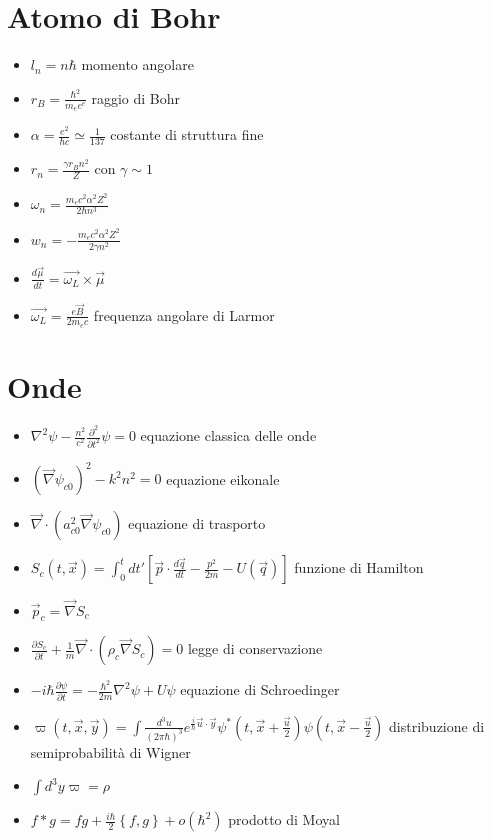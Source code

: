 \documentclass[a4paper]{article}
\begin{document}
    \section{Atomo di Bohr}
        \begin{itemize}
            \item $l_n=n\hbar$ momento angolare
            \item $r_B=\frac{\hbar^2}{m_ee^e}$ raggio di Bohr
            \item $\alpha=\frac{e^2}{\hbar c}\simeq\frac{1}{137}$ costante di struttura fine
            \item $r_n=\frac{\gamma r_Bn^2}{Z}$ con $\gamma\sim 1$
            \item $\omega_n=\frac{m_ec^2\alpha^2Z^2}{2\hbar n^3}$
            \item $w_n=-\frac{m_ec^2\alpha^2Z^2}{2\gamma n^2}$
            \item $\frac{d\vec{\mu}}{dt}=\vec{\omega_L}\times\vec{\mu}$
            \item $\vec{\omega_L}=\frac{e\vec{B}}{2m_ec}$ frequenza angolare di Larmor
        \end{itemize}
    
    \section{Onde}
        \begin{itemize}
            \item $\nabla^2\psi-\frac{n^2}{c^2}\frac{\partial^2}{\partial t^2}\psi=0$ equazione classica delle onde
            \item $(\vec{\nabla}\psi_{c0})^2-k^2n^2=0$ equazione eikonale
            \item $\vec{\nabla}\cdot(a_{c0}^2\vec{\nabla}\psi_{c0})$ equazione di trasporto
            \item $S_c(t,\vec{x})=\int_0^t dt'\left[\vec{p}\cdot\frac{d\vec{q}}{dt}-\frac{p^2}{2m}-U(\vec{q})\right]$ funzione di Hamilton
            \item $\vec{p}_c=\vec{\nabla}S_c$
            \item $\frac{\partial S_c}{\partial t}+\frac{1}{m}\vec{\nabla}\cdot(\rho_c\vec{\nabla}S_c)=0$ legge di conservazione
            \item $-i\hbar\frac{\partial\psi}{\partial t}=-\frac{\hbar^2}{2m}\nabla^2\psi+U\psi$ equazione di Schroedinger
            \item $\varpi(t,\vec{x},\vec{y})=\int\frac{d^3u}{(2\pi\hbar)^3}e^{\frac{i}{\hbar}\vec{u}\cdot\vec{y}}\psi^\ast(t,\vec{x}+\frac{\vec{u}}{2})\psi(t,\vec{x}-\frac{\vec{u}}{2})$ distribuzione di semiprobabilità di Wigner
            \item $\int d^3y\varpi=\rho$
            \item $f\ast g=fg+\frac{i\hbar}{2}\left\{f,g\right\}+o(\hbar^2)$ prodotto di Moyal
        \end{itemize}
    
\end{document}
